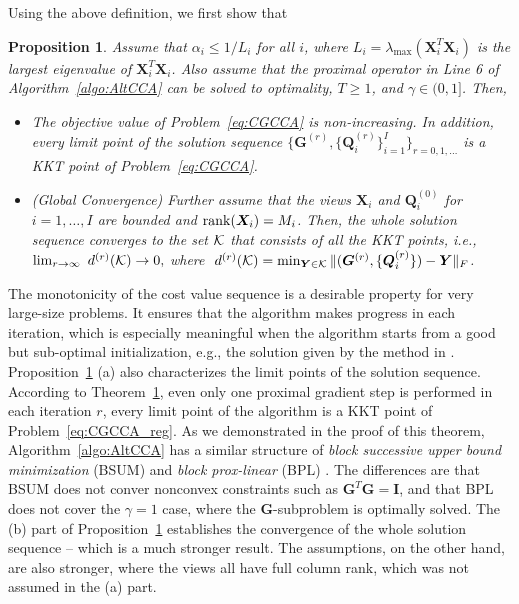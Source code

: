 \documentclass[10pt,journal]{IEEEtran}
\newtheorem{Prop}{Proposition}
\newcommand{\G}{\boldsymbol{G}}
\begin{document}
Using the above definition, we first show that
\begin{Prop}\label{lem:monotonicity}
Assume that $\alpha_i \leq 1/L_i$ for all $i$, where $L_i=\lambda_{\max}({\bm X}_i^T{\bm X}_i)$ is the largest eigenvalue of ${\bm X}_i^T{\bm X}_i$.
Also assume that the proximal operator in Line 6 of Algorithm~\ref{algo:AltCCA} can be solved to optimality, $T\geq 1$, and $\gamma\in(0,1]$. Then, 
\begin{itemize}
\item[a)] The objective value of Problem~\eqref{eq:CGCCA} is non-increasing.
In addition, every limit point of the solution sequence $\{{\bm G}^{(r)},\{{\bm Q}^{(r)}_i\}_{i=1}^I\}_{r=0,1,\ldots}$ is a KKT point of Problem~\eqref{eq:CGCCA}.
\item[b)] (Global Convergence) Further assume that the views ${\bm X}_i$ and ${\bm Q}^{(0)}_i$ for $i=1,\ldots,I$ are bounded and ${\rm rank}({\bm X}_i)=M_i$.
Then, the whole solution sequence converges to the set ${\cal K}$ that consists of all the KKT points, i.e., $\lim_{r\rightarrow \infty}~d^{(r)}({\cal K})\rightarrow 0,$
where $~d^{(r)}({\cal K})=\min_{{\bm Y}\in{\cal K}}\|({\bm G}^{(r)},\{{\bm Q}_i^{(r)}\})-{\bm Y}\|_F$.
\end{itemize}
\end{Prop}
The monotonicity of the cost value sequence is a desirable property for very large-size problems. It ensures that the algorithm makes progress in each iteration, which is especially meaningful when the algorithm starts from a good but sub-optimal initialization, e.g., the solution given by the method in \cite{rastogimultiview}.
Proposition~\ref{lem:monotonicity} (a) also characterizes the limit points of the solution sequence.
According to Theorem~\ref{lem:monotonicity}, even only one proximal gradient step is performed in each iteration $r$, every limit point of the algorithm is a KKT point of Problem~\eqref{eq:CGCCA_reg}.
As we demonstrated in the proof of this theorem, 
Algorithm~\ref{algo:AltCCA} has a similar structure of \emph{block successive upper bound minimization} (BSUM) \cite{razaviyayn2013unified} and \emph{block prox-linear} (BPL) \cite{xu2013block,xu2014globally}.
The differences are that BSUM does not conver nonconvex constraints such as $\G^T\G={\bm I}$,
and that BPL does not cover the $\gamma=1$ case, where the $\G$-subproblem is optimally solved.
The (b) part of Proposition~\ref{lem:monotonicity} establishes the convergence of the whole solution sequence -- which is a much stronger result. The assumptions, on the other hand, are also stronger, where the views all have full column rank, which was not assumed in the (a) part.
\end{document}
